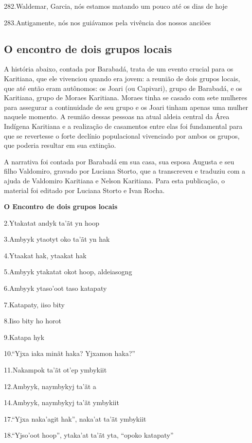 282.Waldemar, Garcia, nós estamos matando um pouco até os dias de hoje

283.Antigamente, nós nos guiávamos pela vivência dos nossos anciões

\subsection{O encontro de dois grupos
locais}\label{o-encontro-de-dois-grupos-locais}

A história abaixo, contada por Barabadá, trata de um evento crucial para
os Karitiana, que ele vivenciou quando era jovem: a reunião de dois
grupos locais, que até então eram autônomos: os Joari (ou Capivari),
grupo de Barabadá, e os Karitiana, grupo de Moraes Karitiana. Moraes
tinha se casado com sete mulheres para assegurar a continuidade de seu
grupo e os Joari tinham apenas uma mulher naquele momento. A reunião
dessas pessoas na atual aldeia central da Área Indígena Karitiana e a
realização de casamentos entre elas foi fundamental para que se
revertesse o forte declínio populacional vivenciado por ambos os grupos,
que poderia resultar em sua extinção.

A narrativa foi contada por Barabadá em sua casa, sua esposa Augusta e
seu filho Valdomiro, gravado por Luciana Storto, que a transcreveu e
traduziu com a ajuda de Valdomiro Karitiana e Nelson Karitiana. Para
esta publicação, o material foi editado por Luciana Storto e Ivan Rocha.

\textbf{O Encontro de dois grupos locais}

2.Ytakatat andyk ta'ãt yn hoop

3.Ambyyk ytaotyt oko ta'ãt yn hak

4.Ytaakat hak, ytaakat hak

5.Ambyyk ytakatat okot hoop, aldeiasogng

6.Ambyyk ytaso'oot taso katapaty

7.Katapaty, iiso bity

8.Iiso bity ho horot

9.Katapa hyk

10.``Yjxa iaka minãt haka? Yjxamon haka?''

11.Nakampok ta'ãt ot'ep ymbykiit

12.Ambyyk, naymbykyj ta'ãt a

14.Ambyyk, naymbykyj ta'ãt ymbykiit

17.``Yjxa naka'agit hak'', naka'at ta'ãt ymbykiit

18.``Yjso'oot hoop'', ytaka'at ta'ãt yta, ``opoko katapaty''

